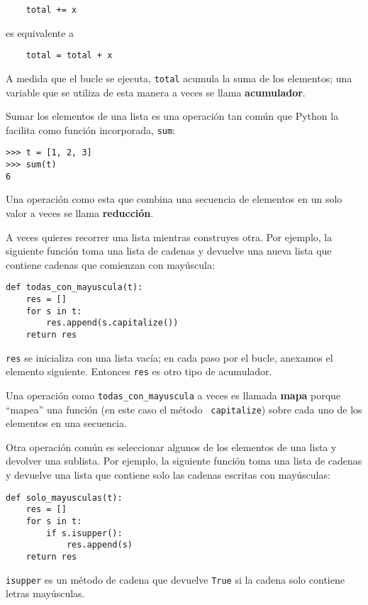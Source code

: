 \documentclass[10pt]{book}
\begin{document}
\begin{verbatim}
    total += x
\end{verbatim}
%
es equivalente a

\begin{verbatim}
    total = total + x
\end{verbatim}
%
A medida que el bucle se ejecuta, {\tt total} acumula la suma de los
elementos; una variable que se utiliza de esta manera a veces se llama
{\bf acumulador}.

Sumar los elementos de una lista es una operación tan común
que Python la facilita como función incorporada, {\tt sum}:

\begin{verbatim}
>>> t = [1, 2, 3]
>>> sum(t)
6
\end{verbatim}
%
Una operación como esta que combina una secuencia de elementos en
un solo valor a veces se llama {\bf reducción}.

A veces quieres recorrer una lista mientras construyes
otra.  Por ejemplo, la siguiente función toma una lista de cadenas
y devuelve una nueva lista que contiene cadenas que comienzan con mayúscula:

\begin{verbatim}
def todas_con_mayuscula(t):
    res = []
    for s in t:
        res.append(s.capitalize())
    return res
\end{verbatim}
%
{\tt res} se inicializa con una lista vacía; en cada paso por el bucle,
anexamos el elemento siguiente.  Entonces {\tt res} es otro
tipo de acumulador.

Una operación como \verb"todas_con_mayuscula" a veces es llamada {\bf
mapa} porque ``mapea'' una función (en este caso el método {\tt
capitalize}) sobre cada uno de los elementos en una secuencia.

Otra operación común es seleccionar algunos de los elementos de
una lista y devolver una sublista.  Por ejemplo, la siguiente
función toma una lista de cadenas y devuelve una lista que contiene
solo las cadenas escritas con mayúsculas:

\begin{verbatim}
def solo_mayusculas(t):
    res = []
    for s in t:
        if s.isupper():
            res.append(s)
    return res
\end{verbatim}
%
{\tt isupper} es un método de cadena que devuelve {\tt True} si
la cadena solo contiene letras mayúsculas.
\end{document}
